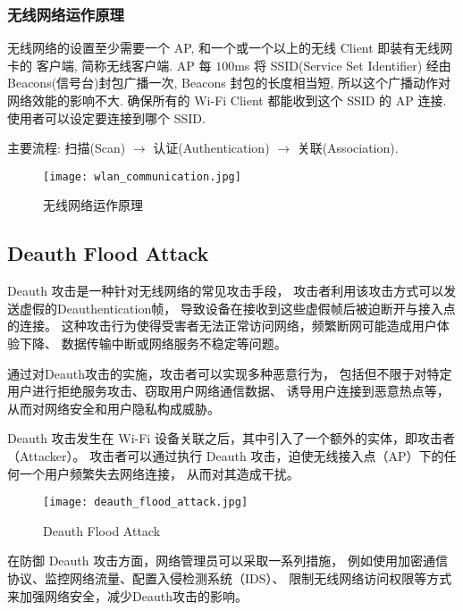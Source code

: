\documentclass[../main.tex]{subfiles}
\begin{document}
\subsubsection*{无线网络运作原理}
无线网络的设置至少需要一个 AP, 和一个或一个以上的无线 Client 即装有无线网卡的
客户端, 简称无线客户端. AP 每 $ 100 $ms 将 SSID(Service Set Identifier) 经由
Beacons(信号台)封包广播一次, Beacons 封包的长度相当短,
所以这个广播动作对网络效能的影响不大. 确保所有的 Wi-Fi Client 都能收到这个 SSID
的 AP 连接. 使用者可以设定要连接到哪个 SSID.

主要流程: 扫描(Scan) $ \rightarrow $ 认证(Authentication) $ \rightarrow $
关联(Association).

\begin{figure}[H]
  \begin{center}
    \texttt{[image: wlan\_communication.jpg]}
  \end{center}
  \caption{无线网络运作原理}
\end{figure}
%
\subsection{Deauth Flood Attack}
Deauth 攻击是一种针对无线网络的常见攻击手段，
攻击者利用该攻击方式可以发送虚假的Deauthentication帧，
导致设备在接收到这些虚假帧后被迫断开与接入点的连接。
这种攻击行为使得受害者无法正常访问网络，频繁断网可能造成用户体验下降、
数据传输中断或网络服务不稳定等问题。

通过对Deauth攻击的实施，攻击者可以实现多种恶意行为，
包括但不限于对特定用户进行拒绝服务攻击、窃取用户网络通信数据、
诱导用户连接到恶意热点等，从而对网络安全和用户隐私构成威胁。

Deauth 攻击发生在 Wi-Fi 设备关联之后，其中引入了一个额外的实体，即攻击者（Attacker）。
攻击者可以通过执行 Deauth 攻击，迫使无线接入点（AP）下的任何一个用户频繁失去网络连接，
从而对其造成干扰。

\begin{figure}[H]
  \begin{center}
    \texttt{[image: deauth\_flood\_attack.jpg]}
  \end{center}
  \caption{Deauth Flood Attack}
\end{figure}

在防御 Deauth 攻击方面，网络管理员可以采取一系列措施，
例如使用加密通信协议、监控网络流量、配置入侵检测系统（IDS）、
限制无线网络访问权限等方式来加强网络安全，减少Deauth攻击的影响。
\end{document}
